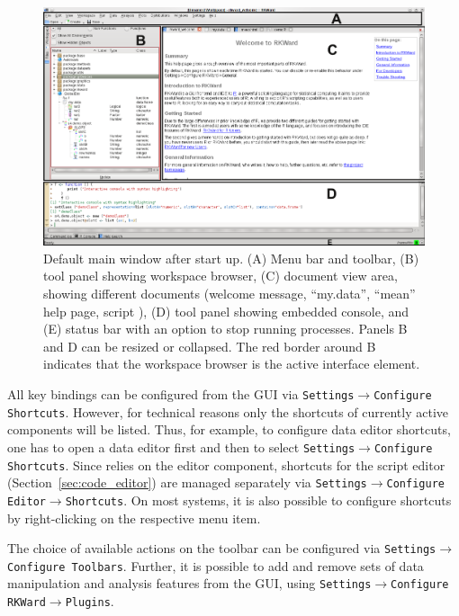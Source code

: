 \begin{figure}[t!]
 \centering
 \includegraphics[width=15.450cm]{./figures/main_window.png}
 \caption{Default  main window after start up. 
(A) Menu bar and toolbar, (B) tool panel showing workspace browser, (C) document view area, showing
different documents (welcome message,  ``my.data'', ``mean'' help page, 
script ), (D) tool panel showing embedded  console, and (E) status bar with an option to
stop running processes. Panels B and D can be resized or collapsed. The red border around B indicates that the
workspace browser is the active interface element.}
 \label{fig:main_window}
\end{figure}

All key bindings can be configured from the GUI via \texttt{Settings$\rightarrow$Configure Shortcuts}. 
However, for technical reasons only the shortcuts of currently active components 
will be listed. Thus, for example, to
configure data editor shortcuts, one has to open a data editor first and
then to select \texttt{Settings$\rightarrow$Configure Shortcuts}. Since  relies on the 
 editor component,
shortcuts for the script editor (Section~\ref{sec:code_editor}) are managed separately via 
\texttt{Settings$\rightarrow$Configure Editor$\rightarrow$Shortcuts}. On most systems, it is also
possible to configure shortcuts by right-clicking on the respective
menu item.

The choice of available actions on the toolbar can be
configured via \texttt{Settings$\rightarrow$Configure Toolbars}. Further, it is possible to add and remove sets
of data manipulation and analysis features from the GUI, using
\texttt{Settings$\rightarrow$Configure RKWard$\rightarrow$Plugins}.

